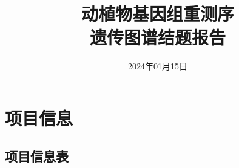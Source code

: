\documentclass[
  a4paper,
  titlepage]{article}
\title{\textbf{动植物基因组重测序}\\
\textbf{遗传图谱结题报告}}
\author{}
\date{\vspace{-2.5em}2024年01月15日}
\begin{document}
\maketitle

{
\setcounter{tocdepth}{3}
\tableofcontents
}
\newpage
\setcounter{page}{1}

\hypertarget{ux9879ux76eeux4fe1ux606f}{%
\section{项目信息}\label{ux9879ux76eeux4fe1ux606f}}

\hypertarget{ux9879ux76eeux4fe1ux606fux8868}{%
\subsection{项目信息表}\label{ux9879ux76eeux4fe1ux606fux8868}}
\end{document}
